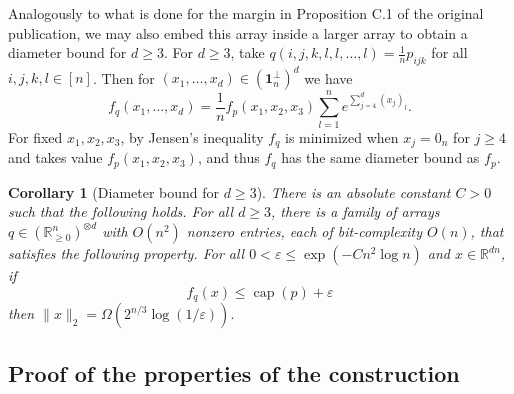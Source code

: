 \documentclass[10pt,a4paper]{article}
\newtheorem{cor}[thm]{Corollary}\crefname{cor}{Corollary}{Corollaries}
\numberwithin{equation}{section}
\DeclareMathOperator{\capa}{cap}
\newcommand{\RR}{\mathbb R}
\newcommand{\ot}{\otimes}
\newcommand{\eps}{\varepsilon}
\newcommand{\id}{\mathbf{1}}
\newcommand{\norm}[1]{\lVert#1\rVert}
\begin{document}
Analogously to what is done for the margin in Proposition C.1 of the original publication, we may also embed this array inside a larger array to obtain a diameter bound for $d \geq 3$. For $d \geq 3$, take $q(i,j,k,l,l,\dots, l) = \frac{1}{n} p_{ijk}$ for all $i,j,k,l \in [n]$. Then for $(x_1, \dots, x_d) \in (\id_n^\perp)^d$ we have 
$$f_q(x_1, \dots, x_d) = \frac{1}{n} f_p(x_1,x_2,x_3)  \sum_{l = 1}^n e^{\sum_{j = 4}^d (x_j)_l}.$$
For fixed $x_1, x_2, x_3$, by Jensen's inequality $f_q$ is minimized when $x_j = 0_n$ for $j \geq 4$ and takes value $f_p(x_1, x_2, x_3)$, and thus $f_q$ has the same diameter bound as $f_p$. 


\begin{cor}[Diameter bound for $d \geq 3$]\label{cor:diameter-d}
There is an absolute constant $C > 0$ such that the following holds. For all $d \geq 3$, there is a family of arrays $q \in (\RR_{\geq 0}^n)^{\ot d}$ with $O(n^2)$ nonzero entries, each of bit-complexity $O(n)$, that satisfies the following property. For all $0 <\eps \leq  \exp(- C n^2 \log n)$ and $x \in \RR^{dn}$, if
	$$f_q (x) \leq \capa(p) + \eps$$
	then $\norm{x}_2 = \Omega\left(2^{n/3}\log(1/\eps)\right).$

\end{cor}



\subsection{Proof of the properties of the construction}
\end{document}
